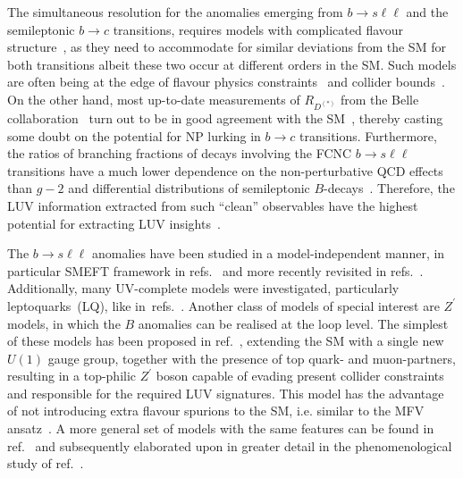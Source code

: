 \par The simultaneous resolution for the anomalies emerging from $ b \to s \ell \ell$ and the semileptonic $b \to c$ transitions, requires models with complicated flavour structure~\cite{DiLuzio:2017vat,Calibbi:2017qbu,Bordone:2017bld,Barbieri:2017tuq,Assad:2017iib,Heeck:2018ntp,Fornal:2018dqn,Crivellin:2018yvo,Crivellin:2019dwb,Bordone:2019uzc}, as they need to accommodate for similar deviations from the SM for both transitions albeit these two occur at different orders in the SM. Such models are often being at the edge of flavour physics constraints~\cite{Bona:2007vi,Silvestrini:2018dos} and collider bounds~\cite{Greljo:2017vvb,Baker:2019sli}.
On the other hand, most up-to-date measurements of $R_{D^{(*)}}$ from the Belle collaboration~\cite{Hirose:2016wfn,Abdesselam:2019dgh} turn out to be in good agreement with the SM~\cite{Bigi:2016mdz,Bernlochner:2017jka,Bigi:2017jbd,Jaiswal:2017rve}, thereby casting some doubt on the potential for NP lurking in $b\to c$ transitions. 
Furthermore, the ratios of branching fractions of decays involving the FCNC $b \to s \ell \ell$ transitions have a much lower dependence on the  non-perturbative QCD effects than $g-2$ and differential distributions of semileptonic $B$-decays~\cite{Capdevila:2016ivx,Serra:2016ivr,Wehle:2016yoi,Alguero:2019pjc}. Therefore, the LUV information extracted from such ``clean'' observables have the highest potential for extracting LUV insights~\cite{Kou:2018nap}.
\par The $ b \to s \ell \ell$ anomalies have been studied in a model-independent manner, in particular SMEFT framework in refs.~\cite{DAmico:2017mtc,Geng:2017svp,Capdevila:2017bsm,Ciuchini:2017mik,Hiller:2017bzc} and more recently revisited in refs.~\cite{Ciuchini:2019usw,Aebischer:2019mlg,Alok:2019ufo,Alguero:2019ptt,Kowalska:2019ley,Arbey:2019duh,Datta:2019zca}.  Additionally, many UV-complete models were investigated, particularly leptoquarks~(LQ), like in~refs.~\cite{Calibbi:2015kma,Dorsner:2016wpm,Buttazzo:2017ixm,Kumar:2018kmr,Cornella:2019hct}. Another class of models of special interest are $Z^\prime$ models, in which the $B$ anomalies can be realised at the loop level. The simplest of these models has been proposed in ref.~\cite{Kamenik:2017tnu}, extending the SM with a single new $U(1)$ gauge group, together with the presence of top quark- and muon-partners, resulting in a top-philic $Z^\prime$ boson capable of evading present collider constraints~\cite{Fox:2018ldq} and responsible for the required LUV signatures. This model has the advantage of not introducing extra flavour spurions to the SM, i.e. similar to the MFV ansatz~\cite{Buras:2000dm,DAmbrosio:2002vsn,Kagan:2009bn}.  A more general set of models with the same features can be found in ref.~\cite{Celis:2017doq} and subsequently elaborated upon in greater detail in the phenomenological study of ref.~\cite{Camargo-Molina:2018cwu}. 

